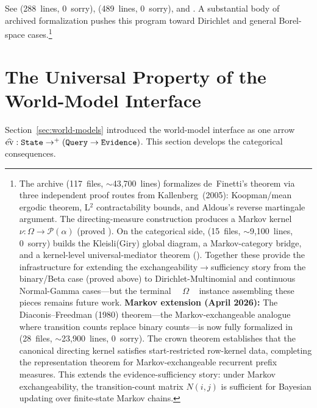 \documentclass[11pt,openany]{report}
\begin{document}
See
(288~lines, 0~sorry),
(489~lines, 0~sorry), and
.
A substantial body of archived formalization pushes this program toward
Dirichlet and general Borel-space cases.\footnote{The
 archive (117~files,
${\sim}$43{,}700~lines) formalizes de~Finetti's theorem via three
independent proof routes from Kallenberg~(2005): Koopman/mean ergodic
theorem, L$^2$ contractability bounds, and Aldous's reverse martingale
argument.  The directing-measure construction produces a Markov kernel
$\nu : \Omega \to \mathcal{P}(\alpha)$ (proved ).
On the categorical side, 
(15~files, ${\sim}$9{,}100~lines, 0~sorry) builds the Kleisli(Giry)
global diagram, a Markov-category bridge, and a kernel-level
universal-mediator theorem
().  Together
these provide the infrastructure for extending the
exchangeability$\to$sufficiency story from the binary/Beta case
(proved above) to Dirichlet-Multinomial and continuous Normal-Gamma
cases---but the terminal ~~$\Omega$%
\code{)}~ instance assembling these pieces remains future
work.  \textbf{Markov extension (April 2026):} The Diaconis--Freedman
(1980) theorem---the Markov-exchangeable analogue where transition
counts replace binary counts---is now fully formalized in
 (28~files,
${\sim}$23{,}900~lines, 0~sorry).  The crown theorem
 establishes
that the canonical directing kernel satisfies start-restricted
row-kernel data, completing the representation theorem for
Markov-exchangeable recurrent prefix measures.  This extends the
evidence-sufficiency story: under Markov exchangeability, the
transition-count matrix $N(i,j)$ is sufficient for Bayesian updating
over finite-state Markov chains.}


\section{The Universal Property of the World-Model Interface}
\label{sec:universal-property}

Section~\ref{sec:world-models} introduced the world-model interface as
one arrow $\widehat{\mathrm{ev}} : \texttt{State} \to^+
(\texttt{Query} \to \mathtt{Evidence})$.  This section develops the categorical
consequences.
\end{document}
